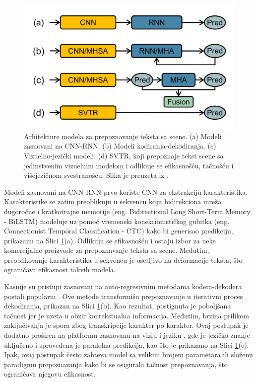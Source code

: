 \documentclass[a4paper,12pt]{article}
\begin{document}
	\begin{figure}[H]
		\centering
		\includegraphics[width=\textwidth]{assets/text-recognition-model-architectures.png}
		\caption{Arhitekture modela za prepoznavanje teksta sa scene. (a) Modeli zasnovani na CNN-RNN. (b) Modeli kodiranja-dekodiranja. (c) Vizuelno-jezički modeli. (d) SVTR, koji prepoznaje tekst scene sa jedinstvenim vizuelnim modelom i odlikuje se efikasnošću, tačnošću i višejezičnom svestranošću. Slika je preuzeta iz \cite{du2022svtrscenetextrecognition}.}
		\label{fig:tr-model-architectures}
	\end{figure}
	
	Modeli zasnovani na CNN-RNN \cite{shi2015endtoend} prvo koriste CNN za ekstrakciju karakteristika. Karakteristike se zatim preoblikuju u sekvencu koju bidirekciona mreža dugoročne i kratkotrajne memorije (eng. Bidirectional Long Short-Term Memory - BiLSTM) modeluje uz pomoć vremenski konekcionističkog gubitka (eng. Connectionist Temporal Classification - CTC) kako bi generisao predikciju, prikazanu na Slici \ref{fig:tr-model-architectures}(a). Odlikuju se efikasnošću i ostaju izbor za neke komercijalne proizvode za prepoznavanje teksta sa scene. Međutim, preoblikovanje karakteristika u sekvencu je osetljivo na deformacije teksta, što ograničava efikasnost takvih modela.
	
	Kasnije su pristupi zasnovani na auto-regresivnim metodama kodera-dekodera postali popularni \cite{sheng2019nrtr, li2019show, zheng2023cdistnet}. Ove metode transformišu prepoznavanje u iterativni proces dekodiranja, prikazan na Slici \ref{fig:tr-model-architectures}(b). Kao rezultat, postignuta je poboljšana tačnost jer je uzeta u obzir kontekstualna informacija. Međutim, brzina prilikom zaključivanja je spora zbog transkripcije karakter po karakter. Ovaj postupak je dodatno proširen na platformu zasnovanu na viziji i jeziku \cite{yu2020accuratescenetextrecognition, fang2021readlikehumansautonomous}, gde je jezičko znanje uključeno i sprovedena je paralelna predikcija, kao što je prikazano na Slici \ref{fig:tr-model-architectures}(c). Ipak, ovaj postupak često zahteva model sa velikim brojem parametara ili složenu paradigmu prepoznavanja kako bi se osigurala tačnost prepoznavanja, što ograničava njegovu efikasnost.
	
\end{document}
